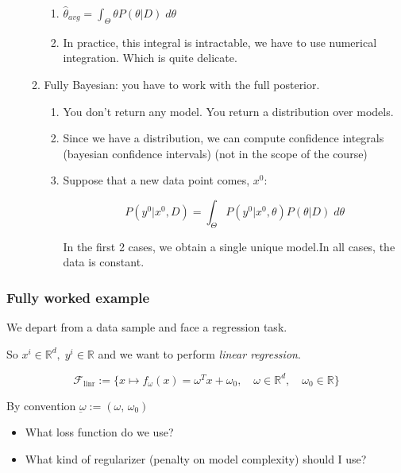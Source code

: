 \begin{enumerate}
\begin{enumerate}
		            \begin{enumerate}
			            \item \(\hat{\theta}_{avg} = \int_\Theta \theta P(\theta | D) \; d\theta\)
			            \item In practice, this integral is intractable, we have to use
			                  numerical integration. Which is quite delicate.
		            \end{enumerate}
		      \item Fully Bayesian: you have to work with the full posterior.
		            \begin{enumerate}
			            \item You don't return any model. You return a distribution over models.
			            \item Since we have a distribution, we can compute confidence integrals
			                  (bayesian confidence intervals) (not in the scope of the course)
			            \item Suppose that a new data point comes, \(x^0\):

			                  \[P(y^0 | x^0, D) = \int_\Theta P(y^0 | x^0, \theta) P(\theta | D)\; d\theta
			                  \]

			                  In the first 2 cases, we obtain a single unique model.In all
			                  cases, the data is constant.
		            \end{enumerate}
	      \end{enumerate}
\end{enumerate}

\subsubsection{Fully worked example}

We depart from a data sample and face a regression task.

So \(x^i \in \mathds{R}^d,\; y^i \in \mathds{R}\) and we want to perform
\emph{linear regression}.

\begin{equation*}
	\mathcal{F}_{\text{linr}} := \bigl\{
	x \mapsto f_\omega(x) = \omega^T x + \omega_0 ,\quad
	\omega \in \mathds{R}^d, \quad
	\omega_0 \in \mathds{R}
	\bigr\}
\end{equation*}

By convention \(\underbar{\omega} := (\omega,\, \omega_0)\)

\begin{itemize}
	\item What loss function do we use?
	\item What kind of regularizer (penalty on model complexity) should I
	      use?
\end{itemize}

